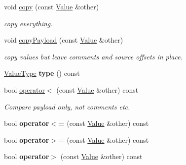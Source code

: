 \begin{DoxyCompactItemize}
\mbox{\label{classJson_1_1Value_a1b2c6379664d91b9f1bcd4d1853e5970}} 
void \hyperlink{classJson_1_1Value_a1b2c6379664d91b9f1bcd4d1853e5970}{copy} (const \hyperlink{classJson_1_1Value}{Value} \&other)
\begin{DoxyCompactList}\small\item\em copy everything. \end{DoxyCompactList}\item 
\mbox{\label{classJson_1_1Value_ab504d299cfaa440392037fa8a3c54064}} 
void \hyperlink{classJson_1_1Value_ab504d299cfaa440392037fa8a3c54064}{copy\+Payload} (const \hyperlink{classJson_1_1Value}{Value} \&other)
\begin{DoxyCompactList}\small\item\em copy values but leave comments and source offsets in place. \end{DoxyCompactList}\item 
\mbox{\label{classJson_1_1Value_a8ce61157a011894f0252ceed232312de}} 
\hyperlink{namespaceJson_a7d654b75c16a57007925868e38212b4e}{Value\+Type} {\bfseries type} () const
\item 
\mbox{\label{classJson_1_1Value_aac6bd14155b88ed2d39ef54820b39e49}} 
bool \hyperlink{classJson_1_1Value_aac6bd14155b88ed2d39ef54820b39e49}{operator$<$} (const \hyperlink{classJson_1_1Value}{Value} \&other) const
\begin{DoxyCompactList}\small\item\em Compare payload only, not comments etc. \end{DoxyCompactList}\item 
\mbox{\label{classJson_1_1Value_a40c411a320a416d5eac0052b36211286}} 
bool {\bfseries operator$<$=} (const \hyperlink{classJson_1_1Value}{Value} \&other) const
\item 
\mbox{\label{classJson_1_1Value_afe2c3e52df60b9622cbd8358b74bdbf5}} 
bool {\bfseries operator$>$=} (const \hyperlink{classJson_1_1Value}{Value} \&other) const
\item 
\mbox{\label{classJson_1_1Value_a4646c2f0764908c0972160c7c2ebe567}} 
bool {\bfseries operator$>$} (const \hyperlink{classJson_1_1Value}{Value} \&other) const

\end{DoxyCompactItemize}
